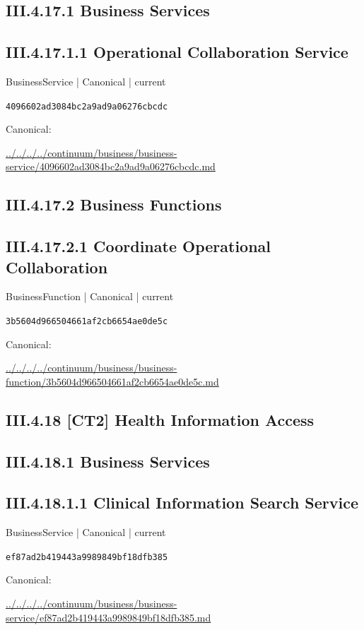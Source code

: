 \documentclass[10pt,a4paper]{article}
\begin{document}
\subsection*{III.4.17.1 Business Services}
\subsection*{III.4.17.1.1 Operational Collaboration Service}
{\small BusinessService | Canonical | current}\par
\texttt{4096602ad3084bc2a9ad9a06276cbcdc}\par
Canonical: \par
{\footnotesize\url{../../../../continuum/business/business-service/4096602ad3084bc2a9ad9a06276cbcdc.md}}\par
\subsection*{III.4.17.2 Business Functions}
\subsection*{III.4.17.2.1 Coordinate Operational Collaboration}
{\small BusinessFunction | Canonical | current}\par
\texttt{3b5604d966504661af2cb6654ae0de5c}\par
Canonical: \par
{\footnotesize\url{../../../../continuum/business/business-function/3b5604d966504661af2cb6654ae0de5c.md}}\par
\subsection*{III.4.18 [CT2] Health Information Access}
\subsection*{III.4.18.1 Business Services}
\subsection*{III.4.18.1.1 Clinical Information Search Service}
{\small BusinessService | Canonical | current}\par
\texttt{ef87ad2b419443a9989849bf18dfb385}\par
Canonical: \par
{\footnotesize\url{../../../../continuum/business/business-service/ef87ad2b419443a9989849bf18dfb385.md}}\par
\end{document}
